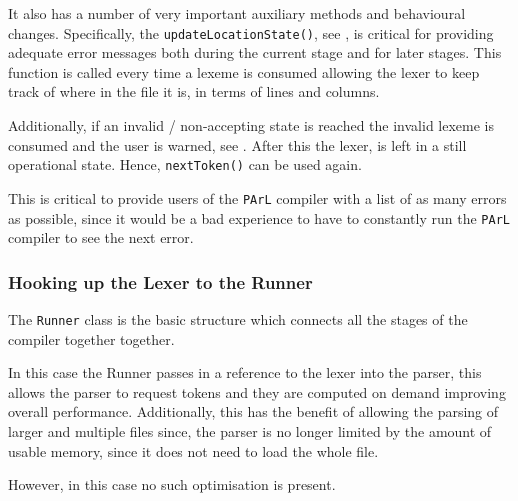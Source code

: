 It also has a number of very important auxiliary
methods and behavioural changes. Specifically, the
\texttt{updateLocationState()}, see
, is critical for providing
adequate error messages both during the current
stage and for later stages. This function is
called every time a lexeme is consumed allowing
the lexer to keep track of where in the file it
is, in terms of lines and columns.



Additionally, if an invalid / non-accepting state
is reached the invalid lexeme is consumed and the
user is warned, see . After
this the lexer, is left in a still operational state.
Hence, \texttt{nextToken()} can be used again.

 This is critical to provide users of the
 \texttt{PArL} compiler with a list of as many
 errors as possible, since it would be a bad
 experience to have to constantly run the
 \texttt{PArL} compiler to see the next error.



\subsubsection{Hooking up the Lexer to the
Runner}\label{sss:runnerlexer}

The \texttt{Runner} class is the basic structure
which connects all the stages of the
compiler together together.

In this case the Runner passes in a reference to
the lexer into the parser, this allows the parser
to request tokens and they are computed on demand
improving overall performance. Additionally, this
has the benefit of allowing the parsing of larger
and multiple files since, the parser is no longer
limited by the amount of usable memory, since it
does not need to load the whole file.

However, in this case no such optimisation is
present.


